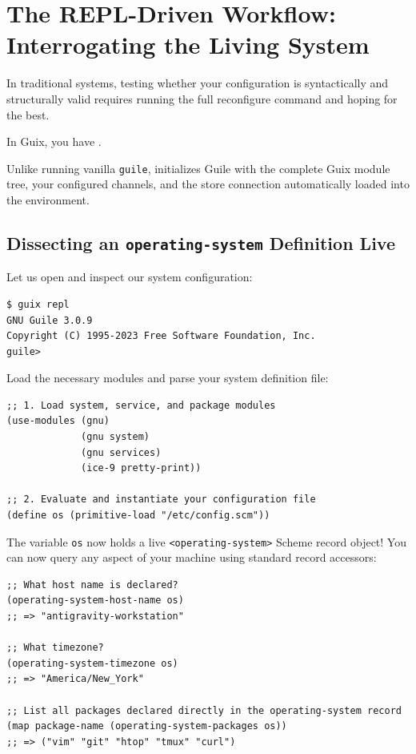 \section{The REPL-Driven Workflow: Interrogating the Living System}

In traditional systems, testing whether your configuration is syntactically and structurally valid requires running the full reconfigure command and hoping for the best. 

In Guix, you have .

Unlike running vanilla \texttt{guile},  initializes Guile with the complete Guix module tree, your configured channels, and the store connection automatically loaded into the environment.

\subsection{Dissecting an \texttt{operating-system} Definition Live}

Let us open  and inspect our system configuration:

\begin{lstlisting}[style=guixcli]
$ guix repl
GNU Guile 3.0.9
Copyright (C) 1995-2023 Free Software Foundation, Inc.
guile> 
\end{lstlisting}

Load the necessary modules and parse your system definition file:
\begin{lstlisting}[style=guixscheme]
;; 1. Load system, service, and package modules
(use-modules (gnu)
             (gnu system)
             (gnu services)
             (ice-9 pretty-print))

;; 2. Evaluate and instantiate your configuration file
(define os (primitive-load "/etc/config.scm"))
\end{lstlisting}

The variable \texttt{os} now holds a live \texttt{<operating-system>} Scheme record object! You can now query any aspect of your machine using standard record accessors:

\begin{lstlisting}[style=guixscheme]
;; What host name is declared?
(operating-system-host-name os)
;; => "antigravity-workstation"

;; What timezone?
(operating-system-timezone os)
;; => "America/New_York"

;; List all packages declared directly in the operating-system record
(map package-name (operating-system-packages os))
;; => ("vim" "git" "htop" "tmux" "curl")
\end{lstlisting}

